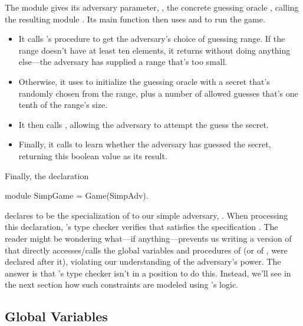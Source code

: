 The module  gives its adversary parameter, , the
concrete guessing oracle , calling the resulting module . Its
main function then uses  and  to run the game.
\begin{itemize}
\item It calls 's  procedure to get the adversary's
  choice of guessing range. If the range doesn't have at least ten elements,
  it returns  without doing anything else---the adversary
  has supplied a range that's too small.

\item Otherwise, it uses  to initialize the guessing
  oracle with a secret that's randomly chosen from the range, plus a
  number of allowed guesses that's one tenth of the range's size.

\item It then calls , allowing the adversary to
  attempt the guess the secret.

\item Finally, it calls  to learn whether the
  adversary has guessed the secret, returning this boolean
  value as its result.
\end{itemize}

Finally, the declaration
\begin{easycrypt}{}{}
module SimpGame = Game(SimpAdv).
\end{easycrypt}
declares  to be the specialization of  to
our simple adversary, . When processing this declaration,
\EasyCrypt's type checker verifies that  satisfies
the specification .
The reader might be wondering what---if anything---prevents us writing
a version of  that directly accesses/calls the global
variables and procedures of  (or of , were 
declared after it), violating our understanding of the adversary's
power. The answer is that \EasyCrypt's type checker isn't in a position
to do this. Instead, we'll see in the next section how such
constraints are modeled using \EasyCrypt's logic.

\subsection{Global Variables}
\label{subsec:globalvariables}


